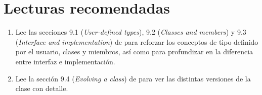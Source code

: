 \section{Lecturas recomendadas}

\begin{enumerate}

\item Lee las secciones 9.1 (\emph{User-defined types}), 9.2 (\emph{Classes and members})
      y 9.3 (\emph{Interface and implementation}) 
      de \pppbook{}
      para reforzar los conceptos de tipo definido por el usuario, clases y
      miembros, así como para profundizar en la diferencia entre interfaz e
      implementación.

\item Lee la sección 9.4 (\emph{Evolving a class}) 
      de \pppbook{}
      para ver las distintas versiones de la clase  con detalle.

\end{enumerate}
